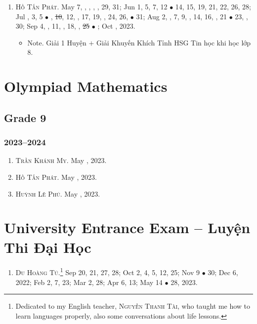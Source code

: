\documentclass{article}
\begin{document}
\begin{enumerate}
	\item \textsc{Hồ Tấn Phát.} May 7, , , , , 29, 31; Jun 1, 5, 7, 12 $\bullet$ 14, 15, 19, 21, 22, 26, 28; Jul , 3, 5 $\bullet$ , \st{10}, 12, , 17, 19, , 24, 26,  $\bullet$ 31; Aug 2, , 7, 9, , 14, 16, , 21 $\bullet$ 23, , 30; Sep 4, , 11, , 18, , \st{25} $\bullet$ ; Oct , 2023.
	\begin{itemize}
		\item {\sf Note.} Giải 1 Huyện $+$ Giải Khuyến Khích Tỉnh HSG Tin học khi học lớp 8.
	\end{itemize}
\end{enumerate}


\section{Olympiad Mathematics}

\subsection{Grade 9}

\subsubsection{2023--2024}

\begin{enumerate}
	\item \textsc{Trần Khánh My.} May , 2023.
	\item \textsc{Hồ Tấn Phát.} May , 2023.
	\item \textsc{Huỳnh Lê Phú.} May , 2023.
\end{enumerate}


\section{University Entrance Exam -- Luyện Thi Đại Học}

\begin{enumerate}
	\item \textsc{Du Hoàng Tú.}\footnote{Dedicated to my English teacher, \textsc{Nguyễn Thanh Tài}, who taught me how to learn languages properly, also some conversations about life lessons.} {\sf[In]} Sep 20, 21, 27, 28; Oct 2, 4, 5, 12, 25; Nov 9 $\bullet$ 30; Dec 6, 2022; Feb 2, 7, 23; Mar 2, 28; Apr 6, 13; May 14 $\bullet$ 28, 2023.
\end{enumerate}
\end{document}
